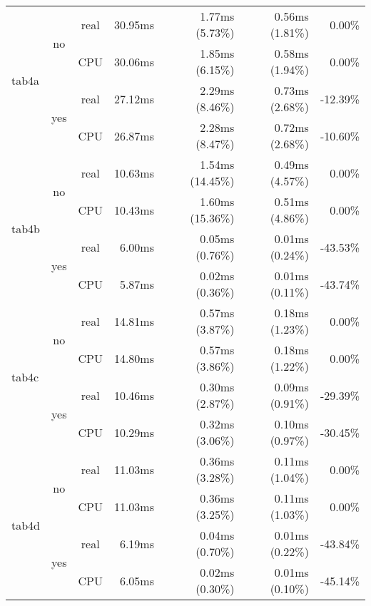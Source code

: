 \documentclass[en]{pracamgr}
\begin{document}
\begin{small}
\begin{longtable}{|l|c|c|r|r|r|r|}
\hline
\multirow{4}{*}{tab4a}    & \multirow{2}{*}{no}  & real & 30.95ms & 1.77ms (5.73\%) & 0.56ms (1.81\%) & 0.00\% \\*
                          &                      & CPU  & 30.06ms & 1.85ms (6.15\%) & 0.58ms (1.94\%) & 0.00\% \\*
                          \cline{2-7}
                          & \multirow{2}{*}{yes} & real & 27.12ms & 2.29ms (8.46\%) & 0.73ms (2.68\%) & -12.39\% \\*
                          &                      & CPU  & 26.87ms & 2.28ms (8.47\%) & 0.72ms (2.68\%) & -10.60\% \\
\hline
\multirow{4}{*}{tab4b}    & \multirow{2}{*}{no}  & real & 10.63ms & 1.54ms (14.45\%) & 0.49ms (4.57\%) & 0.00\% \\*
                          &                      & CPU  & 10.43ms & 1.60ms (15.36\%) & 0.51ms (4.86\%) & 0.00\% \\*
                          \cline{2-7}
                          & \multirow{2}{*}{yes} & real & 6.00ms & 0.05ms (0.76\%) & 0.01ms (0.24\%) & -43.53\% \\*
                          &                      & CPU  & 5.87ms & 0.02ms (0.36\%) & 0.01ms (0.11\%) & -43.74\% \\
\hline
\multirow{4}{*}{tab4c}    & \multirow{2}{*}{no}  & real & 14.81ms & 0.57ms (3.87\%) & 0.18ms (1.23\%) & 0.00\% \\*
                          &                      & CPU  & 14.80ms & 0.57ms (3.86\%) & 0.18ms (1.22\%) & 0.00\% \\*
                          \cline{2-7}
                          & \multirow{2}{*}{yes} & real & 10.46ms & 0.30ms (2.87\%) & 0.09ms (0.91\%) & -29.39\% \\*
                          &                      & CPU  & 10.29ms & 0.32ms (3.06\%) & 0.10ms (0.97\%) & -30.45\% \\
\hline
\multirow{4}{*}{tab4d}    & \multirow{2}{*}{no}  & real & 11.03ms & 0.36ms (3.28\%) & 0.11ms (1.04\%) & 0.00\% \\*
                          &                      & CPU  & 11.03ms & 0.36ms (3.25\%) & 0.11ms (1.03\%) & 0.00\% \\*
                          \cline{2-7}
                          & \multirow{2}{*}{yes} & real & 6.19ms & 0.04ms (0.70\%) & 0.01ms (0.22\%) & -43.84\% \\*
                          &                      & CPU  & 6.05ms & 0.02ms (0.30\%) & 0.01ms (0.10\%) & -45.14\% \\

\end{longtable}
\end{small}
\end{document}
